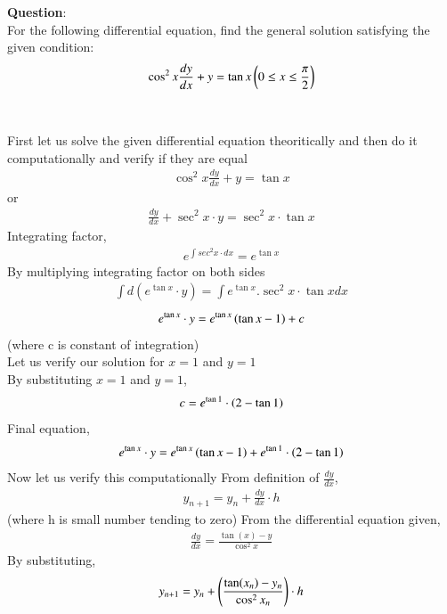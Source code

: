 \documentclass[journal]{IEEEtran}
\begin{document}
\textbf{Question}:\\
For the following differential equation, find the general solution satisfying the given condition:\\
$$\cos^2{x}\frac{dy}{dx}+y=\tan{x} \left(0\le x\le\frac{\pi}{2}\right)$$\\
\solution \\
First let us solve the given differential equation theoritically and then do it computationally and verify if they are equal \\
\begin{align}
   \cos^2{x}\frac{dy}{dx}+y=\tan{x}
\end{align}
or \begin{align}
    \frac{dy}{dx} + \sec^2{x}\cdot y= \sec^2{x}\cdot \tan{x}
\end{align}
Integrating factor,
\begin{align}
    e^{\int{sec^2{x}}\cdot dx}=e^{\tan{x}}
\end{align}
By multiplying integrating factor on both sides
\begin{align}
    \int{d(e^{\tan{x}}\cdot y)}=\int{e^{\tan{x}}. \sec^2{x}\cdot \tan{x}dx}
\end{align}
\begin{align}
e^{\tan{x}}\cdot y=e^{\tan{x}}\left(\tan{x}-1\right) + c
\end{align}
(where c is constant of integration)\\
Let us verify our solution for $x=1$ and $y=1$\\
By substituting $x=1$ and $y=1$,\begin{align}
    c=e^{\tan{1}}\cdot \left(2-\tan{1}\right)
\end{align}
Final equation,
\begin{align}
    e^{\tan{x}}\cdot y=e^{\tan{x}}\left(\tan{x}-1\right) + e^{\tan{1}}\cdot \left(2-\tan{1}\right)
\end{align}
Now let us verify this computationally
From definition of $\frac{dy}{dx}$,
\begin{align}
    y_{n+1}=y_{n}+\frac{dy}{dx}\cdot h    
\end{align}
(where h is small number tending to zero)
From the differential equation given,
\begin{align}
    \frac{dy}{dx}=\frac{\tan(x)-y}{\cos^2{x}}
\end{align}
By substituting,
\begin{align}
    y_{n+1}=y_{n}+\left(\frac{\tan(x_n)-y_n}{\cos^2{x_n}}\right)\cdot h
\end{align}
\end{document}
